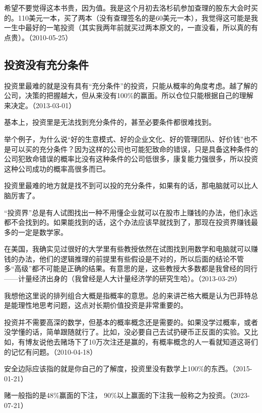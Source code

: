 希望不要觉得这本书贵，因为值。我是这个月初去洛杉矶参加查理的股东大会时买的。110美元一本，买了两本（没有查理签名的是60美元一本），我觉得这可能是我一生中最好的一笔投资（其实我两年前就买过两本原文的，一直没看，所以真的有点贵）。（2010-05-25）

\subsection{投资没有充分条件}

投资里最难的就是没有具有“充分条件”的投资，只能从概率的角度考虑。越了解的公司，决策的把握越大，但从来没有100\%的赢面。所以仓位只能根据自己的理解来决定。（2013-03-01）

基本上，投资里是无法找到充分条件的，甚至必要条件都很难找到。

举个例子，为什么说“好的生意模式、好的企业文化、好的管理团队、好价钱”也不是可以买的充分条件？因为这样的公司也可能犯致命的错误，只是具备这种条件的公司犯致命错误的概率比没有这种条件的公司低很多，康复能力强很多，所以投资这种公司成功的概率高很多而已。

投资里最难的地方就是找不到可以投的充分条件，如果有的话，那电脑就可以比人脑厉害了。

“投资界”总是有人试图找出一种不用懂企业就可以在股市上赚钱的办法，他们永远都不会找到的。如果能找到的话，这个办法应该早就找到了，那现在投资界赚钱最多的一定是数学家。

在美国，我确实见过很好的大学里有些教授依然在试图找到用数学和电脑就可以赚钱的办法，他们的逻辑推理的前提里有些假设是不对的，所以后面的结论不管多“高级”都不可能是正确的结果。有意思的是，这些教授大多数都是我曾经的同行——计量经济出身的（我曾经是人大计量经济学的研究生哈）。（2013-03-29）


我想他这里说的排列组合大概是指概率的意思。总的来讲芒格大概是认为巴菲特总是能理性地思考问题，这点对长期价值投资是非常重要的。

投资并不需要高深的数学，但基本的概率概念还是需要的。如果没学过概率，或者没学懂的话，简单跟随就行了。比如，没必要自己去试扔硬币正反面的实验。又比如，有博友说他去赌场下了10万次注还是赢的，有概率概念的人一看就知道这哥们的记忆有问题。（2010-04-18）

安全边际应该指的就是你自己的了解度，投资里没有数学上100\%的东西。（2015-01-21）

赌一般指的是48\%赢面的下注， 90\%以上赢面的下注我一般称之为投资。（2023-07-21）

